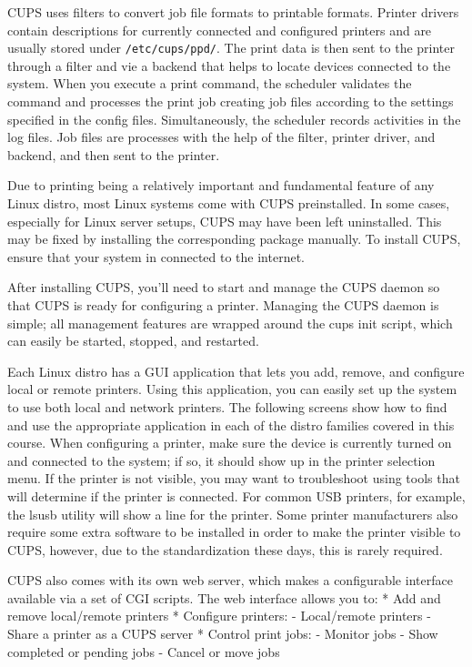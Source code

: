 CUPS uses filters to convert job file formats to printable formats.
Printer drivers contain descriptions for currently connected and
configured printers and are usually stored under
\texttt{/etc/cups/ppd/}. The print data is then sent to the printer
through a filter and vie a backend that helps to locate devices
connected to the system. When you execute a print command, the scheduler
validates the command and processes the print job creating job files
according to the settings specified in the config files. Simultaneously,
the scheduler records activities in the log files. Job files are
processes with the help of the filter, printer driver, and backend, and
then sent to the printer.

Due to printing being a relatively important and fundamental feature of
any Linux distro, most Linux systems come with CUPS preinstalled. In
some cases, especially for Linux server setups, CUPS may have been left
uninstalled. This may be fixed by installing the corresponding package
manually. To install CUPS, ensure that your system in connected to the
internet.

After installing CUPS, you'll need to start and manage the CUPS daemon
so that CUPS is ready for configuring a printer. Managing the CUPS
daemon is simple; all management features are wrapped around the cups
init script, which can easily be started, stopped, and restarted.

Each Linux distro has a GUI application that lets you add, remove, and
configure local or remote printers. Using this application, you can
easily set up the system to use both local and network printers. The
following screens show how to find and use the appropriate application
in each of the distro families covered in this course. When configuring
a printer, make sure the device is currently turned on and connected to
the system; if so, it should show up in the printer selection menu. If
the printer is not visible, you may want to troubleshoot using tools
that will determine if the printer is connected. For common USB
printers, for example, the lsusb utility will show a line for the
printer. Some printer manufacturers also require some extra software to
be installed in order to make the printer visible to CUPS, however, due
to the standardization these days, this is rarely required.

CUPS also comes with its own web server, which makes a configurable
interface available via a set of CGI scripts. The web interface allows
you to: * Add and remove local/remote printers * Configure printers: -
Local/remote printers - Share a printer as a CUPS server * Control print
jobs: - Monitor jobs - Show completed or pending jobs - Cancel or move
jobs

